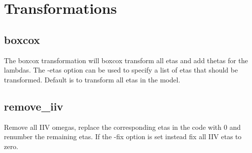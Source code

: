\section{Transformations}
\subsection{boxcox}
The boxcox transformation will boxcox transform all etas and add thetas for the lambdas. The -etas option can be used to specify a list of etas that should be transformed. Default is to transform all etas in the model.
\subsection{remove\_iiv}
Remove all IIV omegas, replace the corresponding etas in the code with 0 and renumber the remaining etas. If the -fix option is set instead fix all IIV etas to zero.


